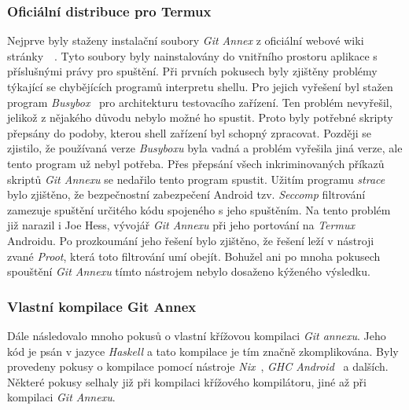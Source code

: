     \subsubsection{Oficiální distribuce pro Termux}
    Nejprve byly staženy instalační soubory \emph{Git Annex} z oficiální webové wiki stránky~~. Tyto soubory byly nainstalovány do vnitřního prostoru aplikace s příslušnými právy pro spuštění. Při prvních pokusech byly zjištěny problémy týkající se chybějících programů interpretu shellu. Pro jejich vyřešení byl stažen program \emph{Busybox}~ pro architekturu testovacího zařízení. Ten problém nevyřešil, jelikož z nějakého důvodu nebylo možné ho spustit. Proto byly potřebné skripty přepsány do podoby, kterou shell zařízení byl schopný zpracovat. Později se zjistilo, že používaná verze \emph{Busyboxu} byla vadná a problém vyřešila jiná verze, ale tento program už nebyl potřeba. Přes přepsání všech inkriminovaných příkazů skriptů \emph{Git Annexu} se nedařilo tento program spustit. Užitím programu \emph{strace} bylo zjištěno, že bezpečnostní zabezpečení Android tzv. \emph{Seccomp} filtrování zamezuje spuštění určitého kódu spojeného s jeho spuštěním. Na tento problém již narazil i Joe Hess, vývojář \emph{Git Annexu} při jeho portování na \emph{Termux} Androidu. Po prozkoumání jeho řešení bylo zjištěno, že řešení leží v nástroji zvané \emph{Proot}, která toto filtrování umí obejít. Bohužel ani po mnoha pokusech spouštění \emph{Git Annexu} tímto nástrojem nebylo dosaženo kýženého výsledku.

    \subsubsection{Vlastní kompilace Git Annex}
    Dále následovalo mnoho pokusů o vlastní křížovou kompilaci \emph{Git annexu}. Jeho kód je psán v jazyce \emph{Haskell} a tato kompilace je tím značně zkomplikována. Byly provedeny pokusy o kompilace pomocí nástroje \emph{Nix}~, \emph{GHC Android}~ a dalších. Některé pokusy selhaly již při kompilaci křížového kompilátoru, jiné až při kompilaci \emph{Git Annexu}.

